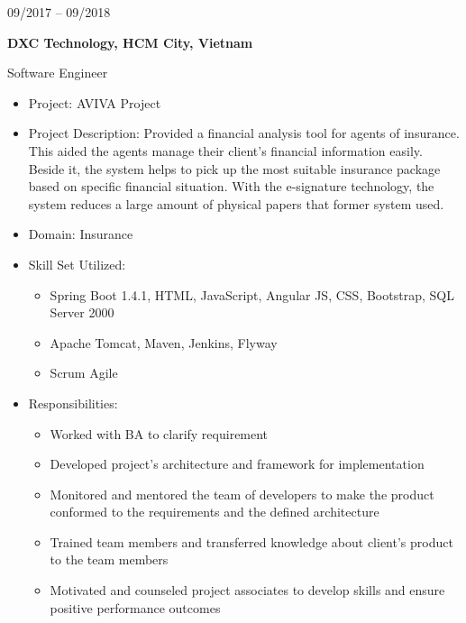 \documentclass[10pt, letterpapaer]{article}
\newcommand{\bigentry}[3]{
\begin{minipage}[t]{.20\linewidth}
\hfill \textsc{#1}
\end{minipage}
\hfill\vline\hfill
\begin{minipage}[t]{.75\linewidth}
{\bf#2}\\{#3}
\end{minipage}\\
\vspace{.2cm}
}
\begin{document}
\bigentry{09/2017 – 09/2018}
{DXC Technology, HCM City, Vietnam}
{Software Engineer
\begin{itemize}
  \item Project: AVIVA Project
  \item Project Description: Provided a financial analysis tool for agents of insurance. This aided the agents manage their client’s financial information easily. Beside it, the system helps to pick up the most suitable insurance package based on specific financial situation. With the e-signature technology, the system reduces a large amount of physical papers that former system used.
  \item Domain: Insurance
  \item Skill Set Utilized:
  \begin{itemize}
	\item Spring Boot 1.4.1, HTML, JavaScript, Angular JS, CSS, Bootstrap, SQL Server 2000
	\item Apache Tomcat, Maven, Jenkins, Flyway
	\item Scrum Agile
  \end{itemize}
  \item Responsibilities:
  \begin{itemize}
	\item Worked with BA to clarify requirement
	\item Developed project’s architecture and framework for implementation
	\item Monitored and mentored the team of developers to make the product conformed to the requirements and the defined architecture
	\item Trained team members and transferred knowledge about client’s product to the team members
	\item Motivated and counseled project associates to develop skills and ensure positive performance outcomes
  \end{itemize}
\end{itemize}}
\end{document}
